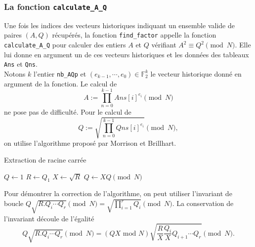 \newpage 
\subsubsection{La fonction \texttt{calculate\_A\_Q}}

Une fois les indices des vecteurs historiques indiquant un ensemble valide de paires 
$(A, Q)$ récupérés, la fonction \texttt{find\_factor} appelle la fonction
\texttt{calculate\_A\_Q} pour calculer des entiers $A$ et $Q$ vérifiant
$A^2 \equiv Q^2 \pmod{N}$. Elle lui donne en argument un de ces vecteurs
historiques et les données des tableaux \texttt{Ans} et \texttt{Qns}. \\

Notons $k$ l'entier \texttt{nb\_AQp} et $(e_{k-1}, \cdots , e_0) \in 
\mathbb{F}_2^{k}$ le vecteur historique donné en argument de la fonction. Le
calcul de \[A:= \prod_{n=0}^{k-1} Ans[i]^{e_i} \pmod{N} \] ne pose pas de 
difficulté. Pour le calcul de \[Q:= \sqrt{\prod_{n=0}^{k-1 } Qns[i] ^{e_i}}
\pmod{N},\] on utilise l'algorithme proposé par Morrison et Brillhart.

\vspace{1em}
\begin{algorithm}[H]
\DontPrintSemicolon
\caption{\sc Extraction de racine carrée}
$Q \gets 1$\;
$R \gets Q_1$\;
$X \gets \sqrt{R}$\;
    $Q \gets XQ \pmod{N}$\;
\;
\end{algorithm}
\vspace{1em}

Pour démontrer la correction de l'algorithme, on peut utiliser l'invariant de 
boucle $Q\sqrt{R.Q_i\cdots Q_r} \pmod{N} = \sqrt{\prod_{i=1}^r Q_{i}}
\pmod{N}$. La conservation de l'invariant découle de l'égalité
\[  Q\sqrt{R.Q_i\cdots Q_r} \pmod{N} = 
(QX\text{ mod }N) \sqrt{ \frac{R}{X}\frac{Q_i}{X}Q_{i+1} \cdots Q_r} \pmod{N}.\]
